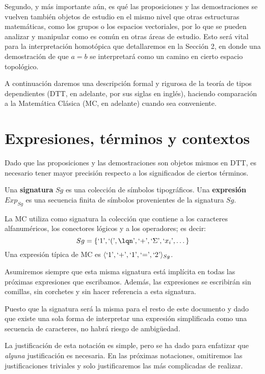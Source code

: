 \documentclass[../main.tex]{subfiles}
\begin{document}
Segundo, y más importante aún, es qué las proposiciones y las demostraciones se vuelven también objetos de estudio en el mismo nivel que otras estructuras matemáticas, como los grupos o los espacios vectoriales, por lo que se pueden analizar y manipular como es común en otras áreas de estudio.
Esto será vital para la interpretación homotópica que detallaremos en la Sección 2, en donde una demostración de que $a=b$ se interpretará como un camino en cierto espacio topológico.

A continuación daremos una descripción formal y rigurosa de la teoría de tipos dependientes (DTT, en adelante, por sus siglas en inglés), haciendo comparación a la Matemática Clásica (MC, en adelante) cuando sea conveniente.

\section{Expresiones, términos y contextos}
Dado que las proposiciones y las demostraciones son objetos mismos en DTT, es necesario tener mayor precisión respecto a los significados de ciertos términos.
\begin{definition}
    Una \textbf{signatura} $Sg$ es una colección de símbolos tipográficos. Una \textbf{expresión} $Exp_{Sg}$ es una secuencia finita de símbolos provenientes de la signatura $Sg$.
\end{definition}
\begin{example}
    La MC utiliza como signatura la colección que contiene a los caracteres alfanum\'ericos, los conectores l\'ogicos y a los operadores; es decir:
    {\color{red} $$Sg=\{\textrm\lq1\textrm\rq,\textrm\lq(\textrm',\textrm\lqn\textrm',\textrm\lq{+}\textrm',\textrm\lq\Sigma\textrm',\textrm`x_i\textrm',\dots\}$$}
    Una expresión t\'ipica {\color{red}de MC} es $\langle \textrm`1\textrm', \textrm`{+}\textrm', \textrm`1\textrm', \textrm`{=}\textrm', \textrm`2\textrm' \rangle_{Sg}$.
\end{example}
\begin{notation}
    Asumiremos siempre que esta misma signatura está implícita en todas las próximas expresiones que escribamos. Además, las expresiones se escribirán sin comillas, sin corchetes y sin hacer referencia a esta signatura.
\end{notation}
\begin{justification}
    {\color{red} Puesto que la signatura ser\'a la misma para el resto de este documento y dado que existe una sola forma de interpretar una expresión simplificada como una secuencia de caracteres, no habr\'a riesgo de ambigüedad.}
\end{justification}
La justificación de esta notación es simple, pero se ha dado para enfatizar que \textit{alguna} justificación es necesaria. En las próximas notaciones, omitiremos las justificaciones triviales y solo justificaremos las más complicadas de realizar.
\end{document}
